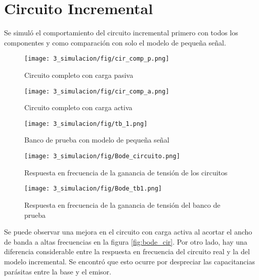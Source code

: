 \newpage
\section{Circuito Incremental}
Se simuló el comportamiento del circuito incremental primero con todos los componentes y como comparación con solo el modelo de pequeña señal.

\begin{figure}[ht]
    \begin{minipage}[t]{0.45\textwidth}
        \centering
        \texttt{[image: 3\_simulacion/fig/cir\_comp\_p.png]}
        \caption{Circuito completo con carga pasiva}
    \end{minipage}\hfill
    \begin{minipage}[t]{0.45\textwidth}
        \centering
        \texttt{[image: 3\_simulacion/fig/cir\_comp\_a.png]}
        \caption{Circuito completo con carga activa}
    \end{minipage}
\end{figure}

\begin{figure}[ht]
    \centering
    \texttt{[image: 3\_simulacion/fig/tb\_1.png]}
    \caption{Banco de prueba con modelo de pequeña señal}
\end{figure}

\begin{figure}[ht]
    \begin{minipage}[t]{0.48\textwidth}
        \centering
        \texttt{[image: 3\_simulacion/fig/Bode\_circuito.png]}
        \caption{Respuesta en frecuencia de la ganancia de tensión de los circuitos}
        \label{fig:bode_cir}
    \end{minipage}\hfill
    \begin{minipage}[t]{0.48\textwidth}
        \centering
        \texttt{[image: 3\_simulacion/fig/Bode\_tb1.png]}
        \caption{Respuesta en frecuencia de la ganancia de tensión del banco de prueba}
        \label{fig:bode_tb1}
    \end{minipage}
\end{figure}

Se puede observar una mejora en el circuito con carga activa al acortar el ancho de banda a altas frecuencias en la figura \ref{fig:bode_cir}. Por otro lado, hay una diferencia considerable entre la respuesta en frecuencia del circuito real y la del modelo incremental. Se encontró que esto ocurre por despreciar las capacitancias parásitas entre la base y el emisor.

